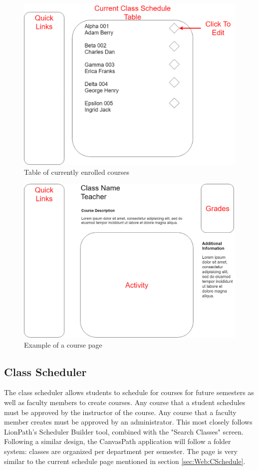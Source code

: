 \documentclass{article}
\begin{document}
      \begin{figure}[H]
        \centering
        \includegraphics[width=4 in]{Design/ClassSchedule/Table}
        \caption{Table of currently enrolled courses}
        \label{fig:CScheduleTable}
      \end{figure}

      \begin{figure}[H]
        \centering
        \includegraphics[width=4 in]{Design/ClassSchedule/CoursePage}
        \caption{Example of a course page}
        \label{fig:CSchedulePage}
      \end{figure}

    \subsection{Class Scheduler}\label{sec:Web:CScheduler}
      The class scheduler allows students to schedule for courses for future semesters as well as faculty members to create courses.  Any course that a student schedules must be approved by the instructor of the course.  Any course that a faculty member creates must be approved by an administrator.  This most closely follows LionPath's Scheduler Builder tool, combined with the "Search Classes" screen.  Following a similar design, the CanvasPath application will follow a folder system: classes are organized per department per semester.  The page is very similar to the current schedule page mentioned in section \ref{sec:Web:CSchedule}.
\end{document}
